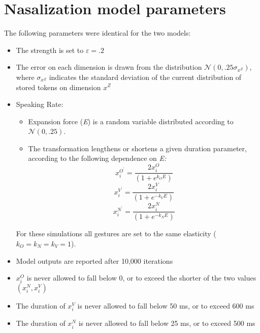 \chapter{\label{chap:Appendix E}Nasalization model parameters}

The following parameters were identical for the two models:
\begin{itemize}
\item The  strength is set to $\varepsilon=.2$
\item The  error on each  dimension is drawn from
the distribution $\mathcal{\mathscr{N}}\left(0,.25\sigma_{x^{Z}}\right)$,
where $\sigma_{x^{Z}}$ indicates the standard deviation of the current
distribution of stored tokens on dimension $x^{Z}$
\item Speaking Rate:
\begin{itemize}
\item Expansion force (\emph{E}) is a random variable distributed according
to $\mathcal{\mathscr{N}\left(\mathrm{0,.25}\right)}$. 
\item The  transformation lengthens or shortens a given duration
parameter, according to the following dependence on \emph{E:}
\begin{equation}
x_{i}^{O^{\prime}}=\frac{2x_{i}^{O}}{(1+e^{k_{O}E})}\label{eq:Speaking rate transform-1}
\end{equation}
\begin{equation}
x_{i}^{V^{\prime}}=\frac{2x_{i}^{V}}{(1+e^{-k_{V}E})}\label{eq:Speaking rate transform-1-1}
\end{equation}
\begin{equation}
x_{i}^{N^\prime}=\frac{2x_{i}^{N}}{(1+e^{-k_{N}E})}\label{eq:Speaking rate transform-1-1-1}
\end{equation}
\end{itemize}
For these simulations all gestures are set to the same elasticity
($k_{O}=k_{N}=k_{V}=1$). 
\item Model outputs are reported after 10,000 iterations
\item $x_{i}^{O}$ is never allowed to fall below 0, or to exceed the shorter
of the two values $(x_{i}^{N},x_{i}^{V})$
\item The duration of $x_{i}^{V}$ is never allowed to fall below 50 ms,
or to exceed 600 ms
\item The duration of $x_{i}^{N}$ is never allowed to fall below 25 ms,
or to exceed 500 ms
\end{itemize}

